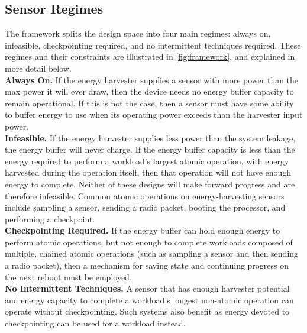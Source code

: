 \subsection{Sensor Regimes}
\label{sec:framework:regime}
The framework splits the design space into four main regimes: always on,
infeasible, checkpointing required, and no intermittent techniques required.
These regimes and their constraints are illustrated in \cref{fig:framework},
and explained in more detail below. \\

\vspace{-6pt}
\noindent
\textbf{Always On.} If the energy harvester supplies a sensor with
more power than the max power it will ever draw, then the device needs
no energy buffer capacity to remain operational. If this is not the case,
then a sensor must have some ability to buffer energy to use when its
operating power exceeds than the harvester input power.
\\

\vspace{-6pt}
\noindent
\textbf{Infeasible.} If the energy harvester supplies less power than
the system leakage, the energy buffer will never
charge. If the energy buffer capacity is less than the
energy required to perform a workload's largest atomic operation, with energy harvested
during the operation itself, then that operation will not have enough energy to
complete.  Neither of these designs will make forward progress and are
therefore infeasible.
Common atomic operations on energy-harvesting sensors include sampling a sensor,
sending a radio packet, booting the processor, and performing a checkpoint.
\\

\vspace{-6pt}
\noindent
\textbf{Checkpointing Required.} If the energy buffer can
hold enough energy to perform atomic operations, but
not enough to complete
workloads composed of multiple, chained
atomic operations (such as sampling a sensor and then sending a radio packet), then
a mechanism for saving state and continuing progress on the next reboot
must be employed.
\\

\vspace{-6pt}
\noindent
\textbf{No Intermittent Techniques.} A sensor that has enough harvester
potential and energy capacity to complete a workload's longest non-atomic
operation can operate without checkpointing. Such systems also benefit as
energy devoted to checkpointing can be used for a workload instead.
\\

